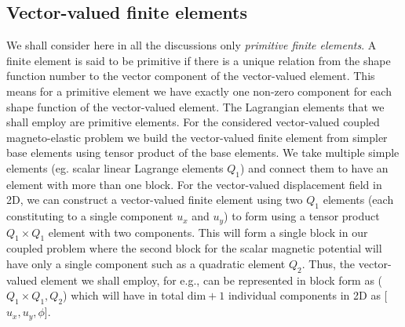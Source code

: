 \subsection*{Vector-valued finite elements} 
We shall consider here in all the discussions only \textit{primitive finite elements}. A finite element is said to be primitive if there is a unique relation from the shape function number to the vector component of the vector-valued element. This means for a primitive element we have exactly one non-zero component for each shape function of the vector-valued element. The Lagrangian elements that we shall employ are primitive elements. For the considered vector-valued coupled magneto-elastic problem we build the vector-valued finite element from simpler base elements using tensor product of the base elements. We take multiple simple elements (eg. scalar linear Lagrange elements $Q_1$) and connect them to have an element with more than one block. For the vector-valued displacement field in 2D, we can construct a vector-valued finite element using two $Q_1$ elements (each constituting to a single component $u_x$ and $u_y$) to form using a tensor product $Q_1 \times Q_1$ element with two components. This will form a single block in our coupled problem where the second block for the scalar magnetic potential will have only a single component such as a quadratic element $Q_2$. Thus, the vector-valued element we shall employ, for e.g., can be represented in block form as ($Q_1 \times Q_1, Q_2$) which will have in total $\text{dim}+1$ individual components in 2D as [$u_x, u_y, \phi$]. \newline 



